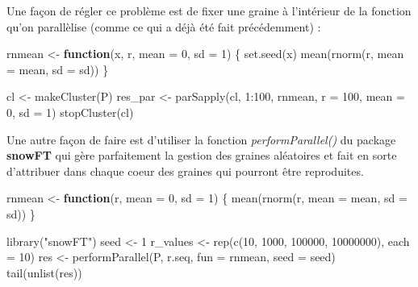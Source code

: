 \documentclass[
]{book}
\newenvironment{Shaded}{\begin{snugshade}}{\end{snugshade}}
\newcommand{\AttributeTok}[1]{\textcolor[rgb]{0.77,0.63,0.00}{#1}}
\newcommand{\ControlFlowTok}[1]{\textcolor[rgb]{0.13,0.29,0.53}{\textbf{#1}}}
\newcommand{\DecValTok}[1]{\textcolor[rgb]{0.00,0.00,0.81}{#1}}
\newcommand{\FunctionTok}[1]{\textcolor[rgb]{0.00,0.00,0.00}{#1}}
\newcommand{\NormalTok}[1]{#1}
\newcommand{\OtherTok}[1]{\textcolor[rgb]{0.56,0.35,0.01}{#1}}
\newcommand{\SpecialCharTok}[1]{\textcolor[rgb]{0.00,0.00,0.00}{#1}}
\newcommand{\StringTok}[1]{\textcolor[rgb]{0.31,0.60,0.02}{#1}}
\theoremstyle{definition}
\theoremstyle{definition}
\theoremstyle{definition}
\theoremstyle{definition}
\theoremstyle{remark}
\begin{document}
Une façon de régler ce problème est de fixer une graine à l'intérieur de la fonction qu'on parallèlise (comme ce qui a déjà été fait précédemment) :

\begin{Shaded}
\begin{Highlighting}[]
\NormalTok{rnmean }\OtherTok{\textless{}{-}} \ControlFlowTok{function}\NormalTok{(x, r, }\AttributeTok{mean =} \DecValTok{0}\NormalTok{, }\AttributeTok{sd =} \DecValTok{1}\NormalTok{) \{}
  \FunctionTok{set.seed}\NormalTok{(x)}
  \FunctionTok{mean}\NormalTok{(}\FunctionTok{rnorm}\NormalTok{(r, }\AttributeTok{mean =}\NormalTok{ mean, }\AttributeTok{sd =}\NormalTok{ sd))}
\NormalTok{\}}

\NormalTok{cl }\OtherTok{\textless{}{-}} \FunctionTok{makeCluster}\NormalTok{(P) }
\NormalTok{res\_par }\OtherTok{\textless{}{-}} \FunctionTok{parSapply}\NormalTok{(cl, }\DecValTok{1}\SpecialCharTok{:}\DecValTok{100}\NormalTok{, rnmean, }
                     \AttributeTok{r =} \DecValTok{100}\NormalTok{, }\AttributeTok{mean =} \DecValTok{0}\NormalTok{, }\AttributeTok{sd =} \DecValTok{1}\NormalTok{)}
\FunctionTok{stopCluster}\NormalTok{(cl) }
\end{Highlighting}
\end{Shaded}

Une autre façon de faire est d'utiliser la fonction \emph{performParallel()} du package \textbf{snowFT} qui gère parfaitement la gestion des graines aléatoires et fait en sorte d'attribuer dans chaque coeur des graines qui pourront être reproduites.

\begin{Shaded}
\begin{Highlighting}[]
\NormalTok{rnmean }\OtherTok{\textless{}{-}} \ControlFlowTok{function}\NormalTok{(r, }\AttributeTok{mean =} \DecValTok{0}\NormalTok{, }\AttributeTok{sd =} \DecValTok{1}\NormalTok{) \{}
        \FunctionTok{mean}\NormalTok{(}\FunctionTok{rnorm}\NormalTok{(r, }\AttributeTok{mean =}\NormalTok{ mean, }\AttributeTok{sd =}\NormalTok{ sd))}
\NormalTok{\}}

\FunctionTok{library}\NormalTok{(}\StringTok{"snowFT"}\NormalTok{)}
\NormalTok{seed }\OtherTok{\textless{}{-}} \DecValTok{1}
\NormalTok{r\_values }\OtherTok{\textless{}{-}} \FunctionTok{rep}\NormalTok{(}\FunctionTok{c}\NormalTok{(}\DecValTok{10}\NormalTok{, }\DecValTok{1000}\NormalTok{, }\DecValTok{100000}\NormalTok{, }\DecValTok{10000000}\NormalTok{), }\AttributeTok{each =} \DecValTok{10}\NormalTok{)}
\NormalTok{res }\OtherTok{\textless{}{-}} \FunctionTok{performParallel}\NormalTok{(P, r.seq, }\AttributeTok{fun =}\NormalTok{ rnmean, }
                \AttributeTok{seed =}\NormalTok{ seed)}
\FunctionTok{tail}\NormalTok{(}\FunctionTok{unlist}\NormalTok{(res))}
\end{Highlighting}
\end{Shaded}
\end{document}
